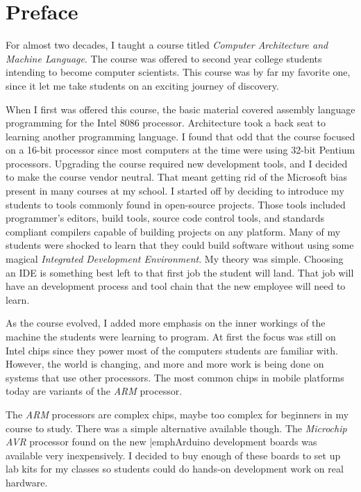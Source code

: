\chapter*{Preface}

For almost two decades, I taught a course titled \emph{Computer Architecture
and Machine Language}. The course was offered to second year college students
intending to become computer scientists. This course was by far my favorite
one, since it let me take students on an exciting journey of discovery.

When I first was offered this course, the basic material covered assembly
language programming for the Intel 8086 processor. Architecture took a back
seat to learning another programming language. I found that odd that the course
focused on a 16-bit processor since most computers at the time were using
32-bit Pentium processors. Upgrading the course required new development tools,
and I decided to make the course vendor neutral. That meant getting rid of the
Microsoft bias present in many courses at my school. I started off by deciding
to introduce my students to tools commonly found in open-source projects. Those
tools included programmer's editors, build tools, source code control tools,
and standards compliant compilers capable of building projects on any platform.
Many of my students were shocked to learn that they could build software
without using some magical \emph{Integrated Development Environment}. My theory
was simple. Choosing an IDE is something best left to that first job the
student will land. That job will have an development process and tool chain
that the new employee will need to learn. 

As the course evolved, I added more emphasis on the inner workings of the
machine the students were learning to program. At first the focus was still on
Intel chips since they power most of the computers students are familiar with.
However, the world is changing, and more and more work is being done on systems
that use other processors. The most common chips in mobile platforms today are
variants of the \emph{ARM} processor. 

The \emph{ARM} processors are complex chips, maybe too complex for beginners in
my course to study. There was a simple alternative available though. The
\emph{Microchip AVR} processor found on the new |emph{Arduino} development
boards was available very inexpensively. I decided to buy enough of these
boards to set up lab kits for my classes so students could do hands-on
development work on real hardware.

